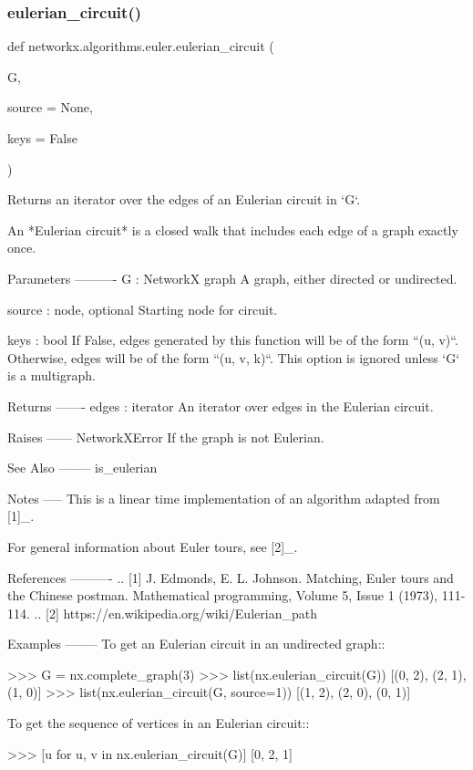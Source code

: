 \subsubsection{\texorpdfstring{eulerian\+\_\+circuit()}{eulerian\_circuit()}}
{\footnotesize\ttfamily def networkx.\+algorithms.\+euler.\+eulerian\+\_\+circuit (\begin{DoxyParamCaption}\item[{}]{G,  }\item[{}]{source = {\ttfamily None},  }\item[{}]{keys = {\ttfamily False} }\end{DoxyParamCaption})}

\begin{DoxyVerb}Returns an iterator over the edges of an Eulerian circuit in `G`.

An *Eulerian circuit* is a closed walk that includes each edge of a
graph exactly once.

Parameters
----------
G : NetworkX graph
   A graph, either directed or undirected.

source : node, optional
   Starting node for circuit.

keys : bool
   If False, edges generated by this function will be of the form
   ``(u, v)``. Otherwise, edges will be of the form ``(u, v, k)``.
   This option is ignored unless `G` is a multigraph.

Returns
-------
edges : iterator
   An iterator over edges in the Eulerian circuit.

Raises
------
NetworkXError
   If the graph is not Eulerian.

See Also
--------
is_eulerian

Notes
-----
This is a linear time implementation of an algorithm adapted from [1]_.

For general information about Euler tours, see [2]_.

References
----------
.. [1] J. Edmonds, E. L. Johnson.
   Matching, Euler tours and the Chinese postman.
   Mathematical programming, Volume 5, Issue 1 (1973), 111-114.
.. [2] https://en.wikipedia.org/wiki/Eulerian_path

Examples
--------
To get an Eulerian circuit in an undirected graph::

    >>> G = nx.complete_graph(3)
    >>> list(nx.eulerian_circuit(G))
    [(0, 2), (2, 1), (1, 0)]
    >>> list(nx.eulerian_circuit(G, source=1))
    [(1, 2), (2, 0), (0, 1)]

To get the sequence of vertices in an Eulerian circuit::

    >>> [u for u, v in nx.eulerian_circuit(G)]
    [0, 2, 1]\end{DoxyVerb}
 \mbox{\label{namespacenetworkx_1_1algorithms_1_1euler_a41ce6ad57053a6e8069ec6232960bfc3}} 
